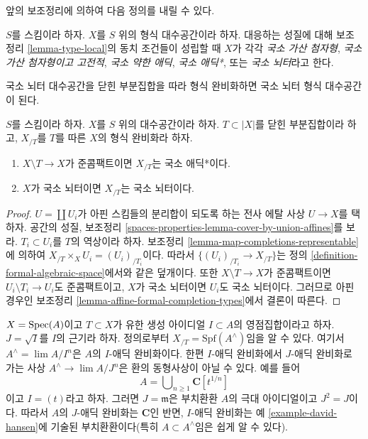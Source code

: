 \noindent
앞의 보조정리에 의하여 다음 정의를 내릴 수 있다.

\begin{definition}
\label{definition-types-formal-algebraic-spaces}
$S$를 스킴이라 하자. $X$를 $S$ 위의 형식 대수공간이라 하자.
대응하는 성질에 대해 보조정리 \ref{lemma-type-local}의 동치 조건들이
성립할 때 $X$가 각각
{\it 국소 가산 첨자형},
{\it 국소 가산 첨자형이고 고전적},
{\it 국소 약한 애딕},
{\it 국소 애딕*}, 또는
{\it 국소 뇌터}라고 한다.
\end{definition}

\noindent
국소 뇌터 대수공간을 닫힌 부분집합을 따라 형식 완비화하면 국소
뇌터 형식 대수공간이 된다.

\begin{lemma}
\label{lemma-formal-completion-types}
$S$를 스킴이라 하자. $X$를 $S$ 위의 대수공간이라 하자.
$T \subset |X|$를 닫힌 부분집합이라 하고, $X_{/T}$를 $T$를 따른
$X$의 형식 완비화라 하자.
\begin{enumerate}
\item $X \setminus T \to X$가 준콤팩트이면 $X_{/T}$는 국소
애딕*이다.
\item $X$가 국소 뇌터이면 $X_{/T}$는 국소 뇌터이다.
\end{enumerate}
\end{lemma}

\begin{proof}
$U = \coprod U_i$가 아핀 스킴들의 분리합이 되도록 하는 전사 에탈
사상 $U \to X$를 택하자. 공간의 성질, 보조정리
\ref{spaces-properties-lemma-cover-by-union-affines}를 보라.
$T_i \subset U_i$를 $T$의 역상이라 하자. 보조정리
\ref{lemma-map-completions-representable}에 의하여
$X_{/T} \times_X U_i = (U_i)_{/T_i}$이다. 따라서
$\{(U_i)_{/T_i} \to X_{/T}\}$는 정의
\ref{definition-formal-algebraic-space}에서와 같은 덮개이다.
또한 $X \setminus T \to X$가 준콤팩트이면
$U_i \setminus T_i \to U_i$도 준콤팩트이고, $X$가 국소 뇌터이면
$U_i$도 국소 뇌터이다. 그러므로 아핀 경우인 보조정리
\ref{lemma-affine-formal-completion-types}에서 결론이 따른다.
\end{proof}

\begin{remark}[경고]
\label{remark-warning-completion}
$X = \mathop{\mathrm{Spec}}(A)$이고 $T \subset X$가 유한 생성 아이디얼
$I \subset A$의 영점집합이라고 하자. $J = \sqrt{I}$를 $I$의
근기라 하자. 정의로부터
$X_{/T} = \text{Spf}(A^\wedge)$임을 알 수 있다. 여기서
$A^\wedge = \lim A/I^n$은 $A$의 $I$-애딕 완비화이다. 한편
$I$-애딕 완비화에서 $J$-애딕 완비화로 가는 사상
$A^\wedge \to \lim A/J^n$은 환의 동형사상이 아닐 수 있다.
예를 들어
$$
A = \bigcup\nolimits_{n \geq 1} \mathbf{C}[t^{1/n}]
$$
이고 $I = (t)$라고 하자. 그러면 $J = \mathfrak m$은 부치환환
$A$의 극대 아이디얼이고 $J^2 = J$이다. 따라서 $A$의 $J$-애딕
완비화는 $\mathbf{C}$인 반면, $I$-애딕 완비화는 예
\ref{example-david-hansen}에 기술된 부치환환이다(특히
$A \subset A^\wedge$임은 쉽게 알 수 있다).
\end{remark}

